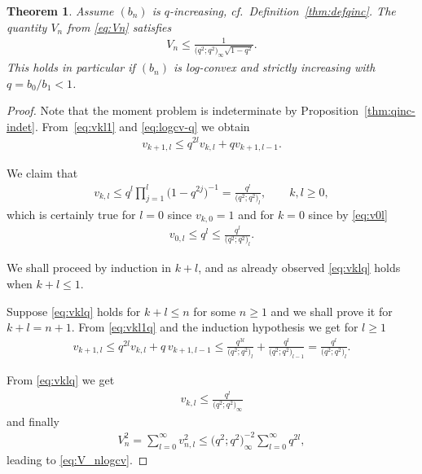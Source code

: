 \documentclass[11pt]{article}
\numberwithin{equation}{section}
\newtheorem{thm}{Theorem}[section]
\begin{document}
\begin{thm}\label{thm:V_nlogcv} Assume $(b_n)$ is $q$-increasing, cf.\ Definition~{\rm \ref{thm:defqinc}}. The quantity $V_n$ from \eqref{eq:Vn} satisfies
\begin{gather}\label{eq:V_nlogcv}
V_n\le\frac{1}{\big(q^2;q^2\big)_\infty\sqrt{1-q^2}}.
\end{gather}
This holds in particular if $(b_n)$ is log-convex and strictly increasing with $q=b_0/b_1<1$.
\end{thm}

\begin{proof} Note that the moment problem is indeterminate by Proposition~\ref{thm:qinc-indet}. From~\eqref{eq:vkl1} and \eqref{eq:logcv-q} we obtain
\begin{gather}\label{eq:vkl1q}
v_{k+1,l}\le q^{2l} v_{k,l}+qv_{k+1,l-1}.
\end{gather}

We claim that
\begin{gather}\label{eq:vklq}
v_{k,l}\le q^l\prod_{j=1}^l \big(1-q^{2j}\big)^{-1}=\frac{q^l}{\big(q^2;q^2\big)_l},\qquad k,l\ge 0,
\end{gather}
which is certainly true for $l=0$ since $v_{k,0}=1$ and for $k=0$ since by \eqref{eq:v0l}
\begin{gather*}
v_{0,l}\le q^l\le \frac{q^l}{\big(q^2;q^2\big)_l}.
\end{gather*}

 We shall proceed by induction in $k+l$, and as already observed \eqref{eq:vklq} holds when $k+l\le 1$.

Suppose \eqref{eq:vklq} holds for $k+l\le n$ for some $n\ge 1$ and we shall prove it for $k+l=n+1$. From \eqref{eq:vkl1q} and the induction hypothesis we get for $l\ge 1$
\begin{gather*}
v_{k+1,l} \le q^{2l}v_{k,l}+q\, v_{k+1,l-1} \le \frac{q^{3l}}{\big(q^2;q^2\big)_{l}}+\frac{q^{l}}{\big(q^2;q^2\big)_{l-1}}=\frac{q^{l}}{\big(q^2;q^2\big)_{l}}.
\end{gather*}

From \eqref{eq:vklq} we get
\begin{gather*}
v_{k,l}\le \frac{q^l}{\big(q^2;q^2\big)_\infty}
\end{gather*}
and finally
\begin{gather*}
V_n^2=\sum_{l=0}^\infty v_{n,l}^2\le \big(q^2;q^2\big)_\infty^{-2}\sum_{l=0}^\infty q^{2l},
\end{gather*}
leading to \eqref{eq:V_nlogcv}.
\end{proof}
\end{document}
